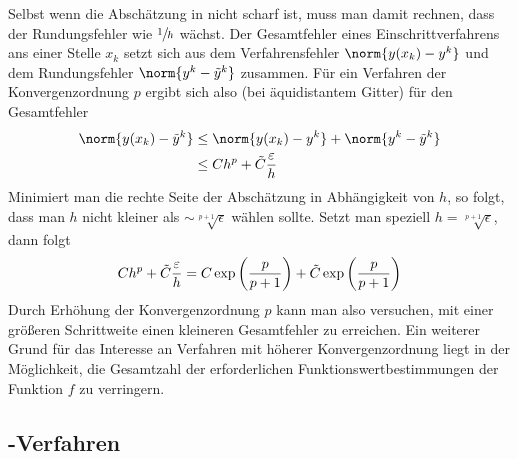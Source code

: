 Selbst wenn die Abschätzung in  nicht scharf ist, muss man damit rechnen, dass der Rundungsfehler wie $\sfrac{1}{h}$ wächst. Der Gesamtfehler eines Einschrittverfahrens ans einer Stelle $x_k$ setzt sich aus dem Verfahrensfehler $\norm{y(x_k)-y^k}$ und dem Rundungsfehler $\norm{y^k-\tilde{y}^k}$ zusammen. Für ein Verfahren der Konvergenzordnung $p$ ergibt sich also (bei äquidistantem Gitter) für den Gesamtfehler
\begin{align}
	\norm{y(x_k)-\tilde{y}^k} &\le \norm{y(x_k)-y^k} + \norm{y^k-\tilde{y}^k} \notag \\
	&\le Ch^p + \tilde{C}\frac{\epsilon}{h} \notag
\end{align}
Minimiert man die rechte Seite der Abschätzung in Abhängigkeit von $h$, so folgt, dass man $h$ nicht kleiner als
$\sim \sqrt[p+1]{\epsilon}$ wählen sollte. Setzt man speziell $h=\sqrt[p+1]{\epsilon}$, dann folgt
\begin{align}
	Ch^p + \tilde{C}\frac{\epsilon}{h} = C\exp\left(\frac{p}{p+1}\right) + \tilde{C}\exp\left(\frac{p}{p+1}\right) \notag
\end{align}
Durch Erhöhung der Konvergenzordnung $p$ kann man also versuchen, mit einer größeren Schrittweite einen kleineren Gesamtfehler zu erreichen. Ein weiterer Grund für das Interesse an Verfahren mit höherer Konvergenzordnung liegt in der Möglichkeit, die Gesamtzahl der erforderlichen Funktionswertbestimmungen der Funktion $f$ zu verringern.

\subsection{-Verfahren}